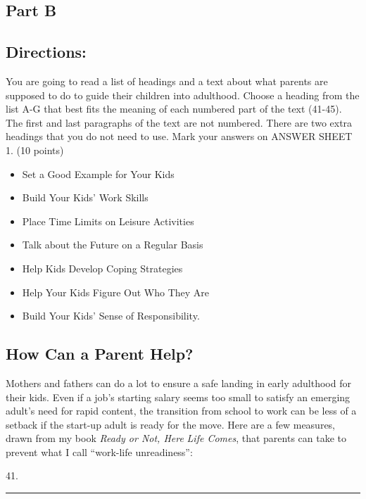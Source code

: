 \documentclass[UTF8,11pt]{ctexart}
\begin{document}
\subsection*{\textbf{Part B}}


\subsection*{\textbf{Directions:}}


You are going to read a list of headings and a text about what parents are supposed to do to guide their children into adulthood. Choose a heading from the list A-G that best fits the meaning of each numbered part of the text (41-45). The first and last paragraphs of the text are not numbered. There are two extra headings that you do not need to use. Mark your answers on ANSWER SHEET 1. (10 points)


\begin{itemize}[leftmargin=2em,itemsep=.2em,topsep=.4em]\item[A.] Set a Good Example for Your Kids
\item[B.] Build Your Kids’ Work Skills
\item[C.] Place Time Limits on Leisure Activities
\item[D.] Talk about the Future on a Regular Basis
\item[E.] Help Kids Develop Coping Strategies
\item[F.] Help Your Kids Figure Out Who They Are
\item[G.] Build Your Kids’ Sense of Responsibility.
\end{itemize}

\subsection*{\textbf{How Can a Parent Help?}}


Mothers and fathers can do a lot to ensure a safe landing in early adulthood for their kids. Even if a job’s starting salary seems too small to satisfy an emerging adult’s need for rapid content, the transition from school to work can be less of a setback if the start-up adult is ready for the move. Here are a few measures, drawn from my book \textit{Ready or Not, Here} \textit{Life Comes}, that parents can take to prevent what I call “work-life unreadiness”:


41. \par\noindent\rule{.95\linewidth}{.4pt}\par
\end{document}
